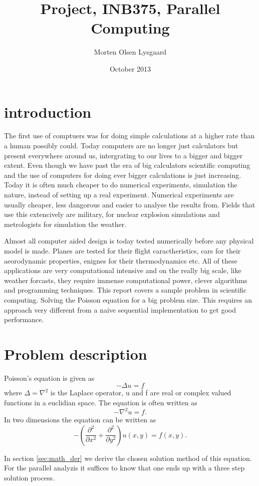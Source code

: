 \documentclass{article}
\title{Project, INB375, Parallel Computing}
\author{Morten Olsen Lysgaard}
\date{October 2013}
\begin{document}
\maketitle

\section{introduction}
The first use of comptuers was for doing simple calculations at a higher rate
than a human possibly could. Today computers are no longer just calculators but
present everywhere around us, intergrating to our lives to a bigger and bigger extent.
Even though we have past the era of big calculators scientific computing and the use
of computers for doing ever bigger calculations is just increasing. Today it is
often much cheaper to do numerical experiments, simulation the nature, instead of
setting up a real experiment. Numerical experiments are usually cheaper, less
dangorous and easier to analyse the results from. Fields that use this extencively
are military, for nuclear explosion simulations and metrologists for simulation the weather.

Almost all computer aided design is today tested numerically before any physical model is made.
Planes are tested for their flight caractheristics, cars for their aeorodynamic properties, enignes
for their thermodynamics etc. All of these applications are very computational intensive and on the
really big scale, like weather forcasts, they require immense computational power, clever algorithms
and programming techniques. This report covers a sample problem in scientific computing. Solving the
Poisson equation for a big problem size. This requires an approach very different from a naive
sequential implementation to get good performance.

\section{Problem description}
\label{sec:sol_steps}
Poisson's equation is given as
\[
-\Delta u = f
\]
where $\Delta = \nabla^2$ is the Laplace operator, u and f are real or complex valued functions in a
euclidian space. The equation is often written as
\[
-\nabla^2 u = f.
\]
In two dimensions the equation can be written as
\[
-\left( \frac{\partial^2}{\partial x^2} + \frac{\partial^2}{\partial y^2} \right) u(x,y) = f(x,y).
\]

In section \ref{sec:math_der} we derive the chosen solution method of this equation. 
For the parallel analyzis it suffices to know that one ends up with a three step solution
process.
\end{document}
